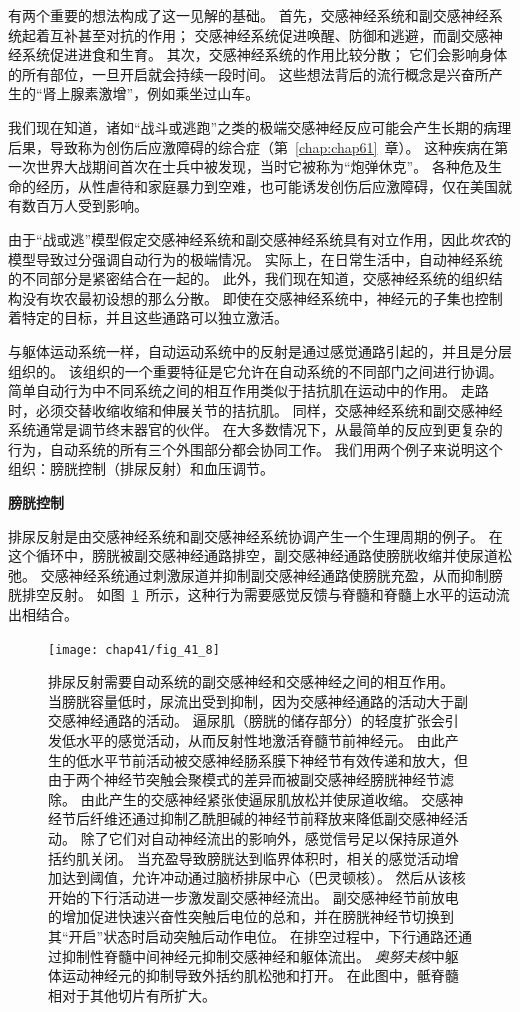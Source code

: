 有两个重要的想法构成了这一见解的基础。
首先，交感神经系统和副交感神经系统起着互补甚至对抗的作用；
交感神经系统促进唤醒、防御和逃避，而副交感神经系统促进进食和生育。
其次，交感神经系统的作用比较分散；
它们会影响身体的所有部位，一旦开启就会持续一段时间。
这些想法背后的流行概念是兴奋所产生的“肾上腺素激增”，例如乘坐过山车。


我们现在知道，诸如“战斗或逃跑”之类的极端交感神经反应可能会产生长期的病理后果，导致称为创伤后应激障碍的综合症（第~\ref{chap:chap61}~章）。
这种疾病在第一次世界大战期间首次在士兵中被发现，当时它被称为“炮弹休克”。
各种危及生命的经历，从性虐待和家庭暴力到空难，也可能诱发创伤后应激障碍，仅在美国就有数百万人受到影响。


由于“战或逃”模型假定交感神经系统和副交感神经系统具有对立作用，因此\textit{坎农}的模型导致过分强调自动行为的极端情况。
实际上，在日常生活中，自动神经系统的不同部分是紧密结合在一起的。
此外，我们现在知道，交感神经系统的组织结构没有坎农最初设想的那么分散。
即使在交感神经系统中，神经元的子集也控制着特定的目标，并且这些通路可以独立激活。


与躯体运动系统一样，自动运动系统中的反射是通过感觉通路引起的，并且是分层组织的。
该组织的一个重要特征是它允许在自动系统的不同部门之间进行协调。
简单自动行为中不同系统之间的相互作用类似于拮抗肌在运动中的作用。
走路时，必须交替收缩收缩和伸展关节的拮抗肌。
同样，交感神经系统和副交感神经系统通常是调节终末器官的伙伴。
在大多数情况下，从最简单的反应到更复杂的行为，自动系统的所有三个外围部分都会协同工作。
我们用两个例子来说明这个组织：膀胱控制（排尿反射）和血压调节。


\textbf{膀胱控制}

排尿反射是由交感神经系统和副交感神经系统协调产生一个生理周期的例子。
在这个循环中，膀胱被副交感神经通路排空，副交感神经通路使膀胱收缩并使尿道松弛。
交感神经系统通过刺激尿道并抑制副交感神经通路使膀胱充盈，从而抑制膀胱排空反射。
如图~\ref{fig:41_8}~所示，这种行为需要感觉反馈与脊髓和脊髓上水平的运动流出相结合。


\begin{figure}[htbp]
	\centering
	\texttt{[image: chap41/fig\_41\_8]}
	\caption{排尿反射需要自动系统的副交感神经和交感神经之间的相互作用\cite{de1993neurophysiology}。
		当膀胱容量低时，尿流出受到抑制，因为交感神经通路的活动大于副交感神经通路的活动。
		逼尿肌（膀胱的储存部分）的轻度扩张会引发低水平的感觉活动，从而反射性地激活脊髓节前神经元。
		由此产生的低水平节前活动被交感神经肠系膜下神经节有效传递和放大，但由于两个神经节突触会聚模式的差异而被副交感神经膀胱神经节滤除。
		由此产生的交感神经紧张使逼尿肌放松并使尿道收缩。
		交感神经节后纤维还通过抑制乙酰胆碱的神经节前释放来降低副交感神经活动。
		除了它们对自动神经流出的影响外，感觉信号足以保持尿道外括约肌关闭。
		当充盈导致膀胱达到临界体积时，相关的感觉活动增加达到阈值，允许冲动通过脑桥排尿中心（巴灵顿核）。
		然后从该核开始的下行活动进一步激发副交感神经流出。
		副交感神经节前放电的增加促进快速兴奋性突触后电位的总和，并在膀胱神经节切换到其“开启”状态时启动突触后动作电位。
		在排空过程中，下行通路还通过抑制性脊髓中间神经元抑制交感神经和躯体流出。
		\textit{奥努夫核}中躯体运动神经元的抑制导致外括约肌松弛和打开。
		在此图中，骶脊髓相对于其他切片有所扩大。}
	\label{fig:41_8}
\end{figure}


